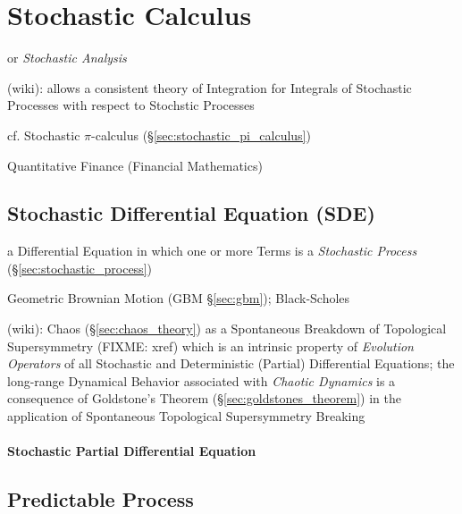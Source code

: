 \section{Stochastic Calculus}\label{sec:stochastic_calculus}

or \emph{Stochastic Analysis}

(wiki): allows a consistent theory of Integration for Integrals of Stochastic
Processes with respect to Stochstic Processes

cf. Stochastic $\pi$-calculus (\S\ref{sec:stochastic_pi_calculus})

Quantitative Finance (Financial Mathematics)



\subsection{Stochastic Differential Equation (SDE)}\label{sec:sde}

a Differential Equation in which one or more Terms is a \emph{Stochastic
  Process} (\S\ref{sec:stochastic_process})

\fist Geometric Brownian Motion (GBM \S\ref{sec:gbm}); Black-Scholes

(wiki): Chaos (\S\ref{sec:chaos_theory}) as a Spontaneous Breakdown of
Topological Supersymmetry (FIXME: xref) which is an intrinsic property of
\emph{Evolution Operators} of all Stochastic and Deterministic (Partial)
Differential Equations; the long-range Dynamical Behavior associated with
\emph{Chaotic Dynamics} is a consequence of Goldstone's Theorem
(\S\ref{sec:goldstones_theorem}) in the application of Spontaneous Topological
Supersymmetry Breaking



\paragraph{Stochastic Partial Differential Equation}\label{sec:spde}\hfill



\subsection{Predictable Process}\label{sec:predictable_process}

